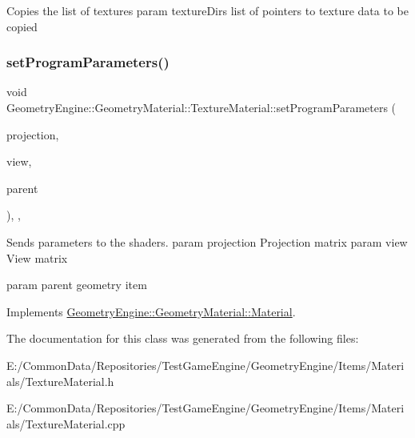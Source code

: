 Copies the list of textures param texture\+Dirs list of pointers to texture data to be copied \mbox{\label{class_geometry_engine_1_1_geometry_material_1_1_texture_material_a985cdde7240f2acb18cd2944c5ca6193}} 
\subsubsection{\texorpdfstring{setProgramParameters()}{setProgramParameters()}}
{\footnotesize\ttfamily void Geometry\+Engine\+::\+Geometry\+Material\+::\+Texture\+Material\+::set\+Program\+Parameters (\begin{DoxyParamCaption}\item[{const Q\+Matrix4x4 \&}]{projection,  }\item[{const Q\+Matrix4x4 \&}]{view,  }\item[{const \mbox{\hyperlink{class_geometry_engine_1_1_geometry_world_item_1_1_geometry_item_1_1_geometry_item}{Geometry\+World\+Item\+::\+Geometry\+Item\+::\+Geometry\+Item}} \&}]{parent }\end{DoxyParamCaption})\hspace{0.3cm}{\ttfamily [override]}, {\ttfamily [protected]}, {\ttfamily [virtual]}}

Sends parameters to the shaders. param projection Projection matrix param view View matrix

param parent geometry item 

Implements \mbox{\hyperlink{class_geometry_engine_1_1_geometry_material_1_1_material_a68310797df53062f237d0005fbcfce7e}{Geometry\+Engine\+::\+Geometry\+Material\+::\+Material}}.



The documentation for this class was generated from the following files\+:\begin{DoxyCompactItemize}
\item 
E\+:/\+Common\+Data/\+Repositories/\+Test\+Game\+Engine/\+Geometry\+Engine/\+Items/\+Materials/Texture\+Material.\+h\item 
E\+:/\+Common\+Data/\+Repositories/\+Test\+Game\+Engine/\+Geometry\+Engine/\+Items/\+Materials/Texture\+Material.\+cpp\end{DoxyCompactItemize}
